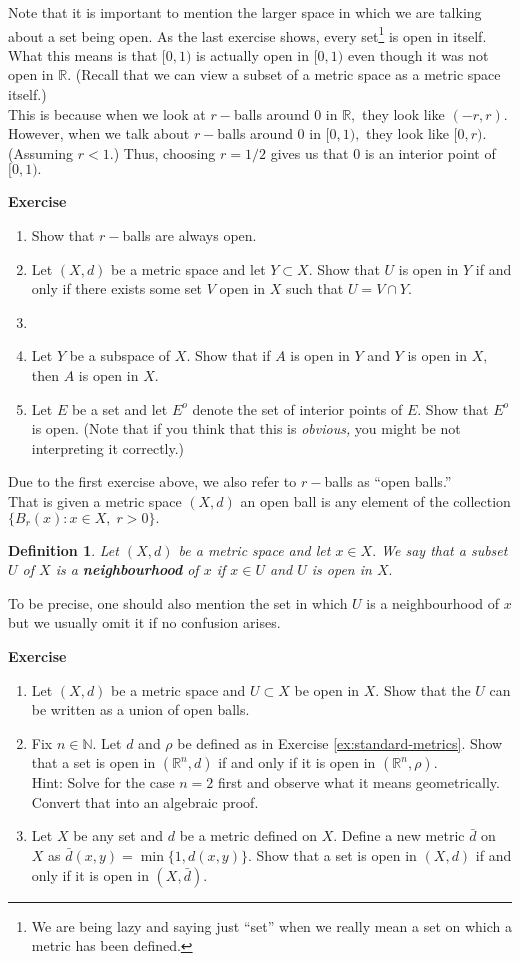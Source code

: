 \documentclass[12pt]{article}
\newtheorem{defn}{Definition}
\newcounter{exercise}
\newcommand{\exercise}{\refstepcounter{exercise}\par\medskip
   {\textbf{Exercise \theexercise }} \rmfamily}
\begin{document}
	Note that it is important to mention the larger space in which we are talking about a set being open. As the last exercise shows, every set\footnote{We are being lazy and saying just ``set'' when we really mean a set on which a metric has been defined.} is open in itself. What this means is that $[0, 1)$ is actually open in $[0, 1)$ even though it was not open in $\mathbb{R}.$ (Recall that we can view a subset of a metric space as a metric space itself.)\\
	This is because when we look at $r-$balls around $0$ in $\mathbb{R},$ they look like $(-r, r).$ However, when we talk about $r-$balls around $0$ in $[0, 1),$ they look like $[0, r).$ (Assuming $r < 1.$) Thus, choosing $r = 1/2$ gives us that $0$ is an interior point of $[0, 1).$\\
	\exercise
	\begin{enumerate}[nosep] 
		\item Show that $r-$balls are always open.
		\item Let $(X, d)$ be a metric space and let $Y \subset X.$ Show that $U$ is open in $Y$ if and only if there exists some set $V$ open in $X$ such that $U = V \cap Y.$
		\item 
		\item Let $Y$ be a subspace of $X.$ Show that if $A$ is open in $Y$ and $Y$ is open in $X,$ then $A$ is open in $X.$
		\item Let $E$ be a set and let $E^o$ denote the set of interior points of $E.$ Show that $E^o$ is open. (Note that if you think that this is \emph{obvious,} you might be not interpreting it correctly.)
	\end{enumerate}
	Due to the first exercise above, we also refer to $r-$balls as ``open balls.''\\
	That is given a metric space $(X, d)$ an open ball is any element of the collection $\{B_r(x) : x \in X,\; r > 0\}.$
	\begin{defn}
		Let $(X, d)$ be a metric space and let $x \in X.$ We say that a subset $U$ of $X$ is a \textbf{neighbourhood} of $x$ if $x \in U$ and $U$ is open in $X.$
	\end{defn}
	To be precise, one should also mention the set in which $U$ is a neighbourhood of $x$ but we usually omit it if no confusion arises. 
	\exercise
	\begin{enumerate}[nosep] 
		\item Let $(X, d)$ be a metric space and $U \subset X$ be open in $X.$ Show that the $U$ can be written as a union of open balls.
		\item Fix $n \in \mathbb{N}.$ Let $d$ and $\rho$ be defined as in Exercise \ref{ex:standard-metrics}. Show that a set is open in $(\mathbb{R}^n, d)$ if and only if it is open in $(\mathbb{R}^n, \rho).$\\
		Hint: Solve for the case $n = 2$ first and observe what it means geometrically. Convert that into an algebraic proof.
		\item Let $X$ be any set and $d$ be a metric defined on $X.$ Define a new metric $\bar{d}$ on $X$ as $\bar{d}(x, y) = \min\{1, d(x, y)\}.$ Show that a set is open in $(X, d)$ if and only if it is open in $(X, \bar{d}).$
	\end{enumerate}
\end{document}

